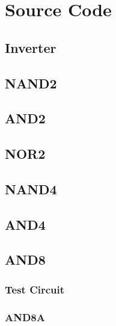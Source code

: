 \documentclass{scrartcl}
\begin{document}
  \section{Source Code}

    \subsection{Inverter}
      
      

    \subsection{NAND2}
      
      

    \subsection{AND2}
      
      

    \subsection{NOR2}
      
      

    \subsection{NAND4}
      

    \subsection{AND4}
      

    \subsection{AND8}
      \subsubsection{Test Circuit}
        
        
      \subsubsection{AND8A}
        
        
\end{document}
